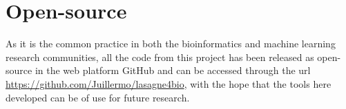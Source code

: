 	
	
	 

\section{Open-source}

As it is the common practice in both the bioinformatics and machine learning research communities, all the code from this project has been released as open-source in the web platform GitHub and can be accessed through the url \url{https://github.com/Juillermo/lasagne4bio}, with the hope that the tools here developed can be of use for future research.
